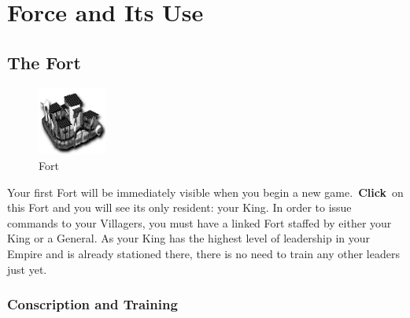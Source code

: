 
\chapter{Force and Its Use}

\section{The Fort}

\begin{figure}
	\vspace{-20pt}
	\begin{center}
		\includegraphics[width=0.2\textwidth]{Ifort}
		\\ Fort
	\end{center}
	\vspace{-20pt}
	\end{figure}

Your first Fort will be immediately visible when you begin a new game. \textbf{Click} on this Fort and you will see its only resident: your King. In order to issue commands to your Villagers, you must have a linked Fort staffed by either your King or a General. As your King has the highest level of leadership in your Empire and is already stationed there, there is no need to train any other leaders just yet. \\

\subsection{Conscription and Training}

